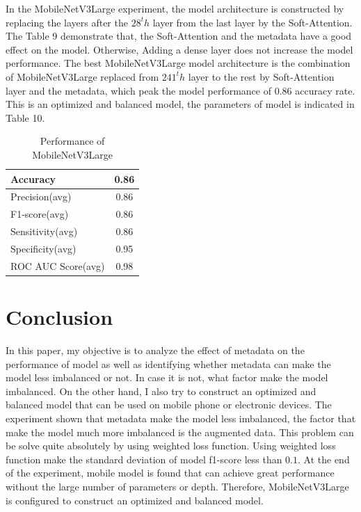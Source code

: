 In the MobileNetV3Large experiment, the model architecture is constructed by replacing the layers after the $28^th$ layer from the last layer by the Soft-Attention. The Table 9 demonstrate that, the Soft-Attention and the metadata have a good effect on the model. Otherwise, Adding a dense layer does not increase the model performance. The best MobileNetV3Large model architecture is the combination of MobileNetV3Large replaced from $241^th$ layer to the rest by Soft-Attention layer and the metadata, which peak the model performance of 0.86 accuracy rate. This is an optimized and balanced model, the parameters of model is indicated in Table 10.\\
\begin{table}
	\centering
	\begin{tabular}{| l | c |}
		\hline
		Accuracy & 0.86\\
		\hline
		Precision(avg) & 0.86\\
		\hline
		F1-score(avg) & 0.86\\
		\hline
		Sensitivity(avg) & 0.86\\
		\hline
		Specificity(avg) & 0.95\\
		\hline
		ROC AUC Score(avg) & 0.98\\
		\hline
	\end{tabular}
\caption{Performance of MobileNetV3Large}
\label{table:10}
\end{table}
\section{Conclusion}
In this paper, my objective is to analyze the effect of metadata on the performance of model as well as identifying whether metadata can make the model less imbalanced or not. In case it is not, what factor make the model imbalanced. On the other hand, I also try to construct an optimized and balanced model that can be used on mobile phone or electronic devices. The experiment shown that metadata make the model less imbalanced, the factor that make the model much more imbalanced is the augmented data. This problem can be solve quite absolutely by using weighted loss function. Using weighted loss function make the standard deviation of model f1-score less than $0.1$. At the end of the experiment, mobile model is found that can achieve great performance without the large number of parameters or depth. Therefore, MobileNetV3Large is configured to construct an optimized and balanced model. 
\clearpage
\pagebreak

